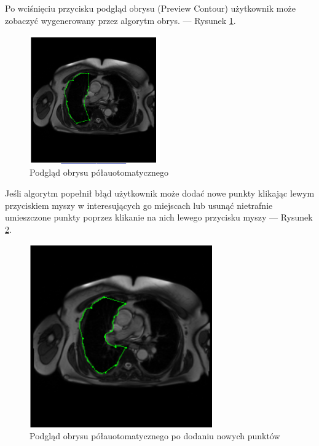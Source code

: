 \documentclass[a4paper,11pt,twoside,openright]{report}
\theoremstyle{definition}
\begin{document}
\begin{enumerate}
Po wciśnięciu przycisku podgląd obrysu (Preview Contour) użytkownik może
zobaczyć wygenerowany przez algorytm obrys. --- Rysunek \ref{fig:12}.

\begin{figure}[h!]
	\center
	\includegraphics[width=0.5\textwidth]{12}
	\caption{Podgląd obrysu półauotomatycznego}
    	\label{fig:12}
\end{figure}

\pagebreak

Jeśli algorytm popełnił błąd użytkownik może dodać nowe punkty klikając lewym
przyciskiem myszy w interesujących go miejscach lub usunąć nietrafnie umieszczone
punkty poprzez klikanie na nich lewego przycisku myszy --- Rysunek \ref{fig:13}.

\begin{figure}[h!]
	\center
	\includegraphics[width=0.7\textwidth]{13}
	\caption{Podgląd obrysu półauotomatycznego po dodaniu nowych punktów}
    	\label{fig:13}
\end{figure}


\end{enumerate}
\end{document}
